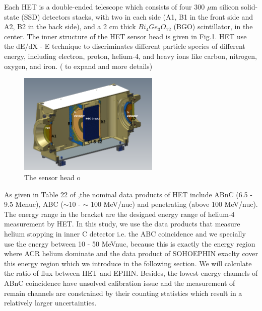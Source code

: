 Each HET is a double-ended telescope which consists of four 300 $\mu$m silicon solid-state (SSD) detectors stacks, with two in each side (A1, B1 in the front side and A2, B2 in the back side), and a 2 cm thick $Bi_{4}Ge_{3}O_{12}$ (BGO) scintillator, in the center. The inner structure of the HET sensor head is given in Fig.\ref{fig:HET-sensor-head}. HET use the dE/dX - E technique to discriminates different particle species of different energy, including electron, proton, helium-4, and heavy ions like carbon, nitrogen, oxygen, and iron.  ( to expand and more details)



\begin{figure}
    \centering
    \includegraphics[width = 0.6\textwidth]{images/het.png}
    \caption{The sensor head o}
    \label{fig:HET-sensor-head}
\end{figure}



As given in Table 22 of \cite{EPD instruemnt},the nominal data products of HET include ABnC (6.5 - 9.5 Me\/nuc), ABC ($\sim$10 - $\sim$ 100 MeV/nuc) and penetrating (above 100 MeV/nuc). The energy range in the bracket are the designed energy range of helium-4 measurement by HET. In this study, we use the data products that measure helium stopping in inner C detector i.e. the ABC coincidence and we specially use the energy between 10 - 50 MeV\/nuc, because this is exactly the energy region where ACR helium dominate and the data product of SOHO\/EPHIN exaclty cover this energy region which we introduce in the following section. We will calculate the ratio of flux between HET and EPHIN. 
Besides, the lowest energy channels of ABnC coincidence have unsolved calibration issue and the measurement of remain channels are constrained by their counting statistics which result in a relatively larger uncertainties.



